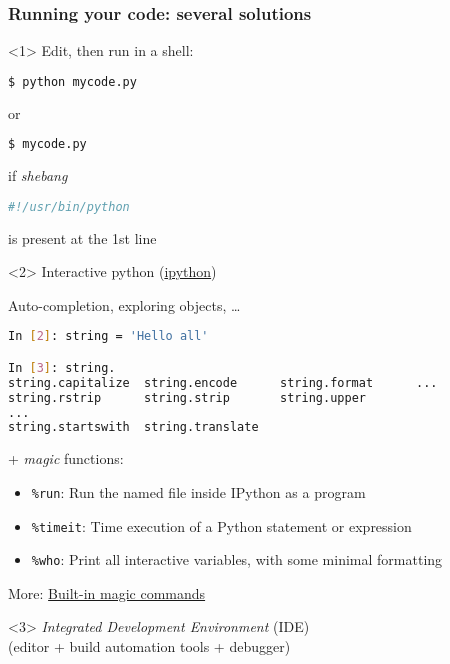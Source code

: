 \begin{frame}[fragile, c]
\frametitle{Running your code: several solutions}

\begin{onlyenv}<1> 
Edit, then run in a shell:
\begin{lstlisting}[language=bash]
$ python mycode.py
\end{lstlisting}
or 
\begin{lstlisting}[language=bash]
$ mycode.py
\end{lstlisting}
if \textit{shebang}
\begin{lstlisting}[language=python]
#!/usr/bin/python
\end{lstlisting}
is present at the 1st line
\end{onlyenv}

\begin{onlyenv}<2> 
Interactive python (\href{http://ipython.org/}{ipython})

Auto-completion, exploring objects, \ldots

\begin{lstlisting}[language=bash]
In [2]: string = 'Hello all'

In [3]: string.
string.capitalize  string.encode      string.format      ...
string.rstrip      string.strip       string.upper       
... 
string.startswith  string.translate   
\end{lstlisting}

+ \textit{magic} functions:

{\footnotesize
\begin{itemize}
\item[] \verb|%run|: Run the named file inside IPython as a program\\
\item[] \verb|%timeit|: Time execution of a Python statement or expression\\
\item[] \verb|%who|: Print all interactive variables, with some minimal formatting
\end{itemize}
}
\vfill

More: \href{http://ipython.readthedocs.org/en/stable/interactive/magics.html?highlight=magic#built-in-magic-commands}{Built-in magic commands}
\end{onlyenv}


\begin{onlyenv}<3> 
\textit{Integrated Development Environment} (IDE)\\
(editor + build automation tools + debugger)


\end{onlyenv}
\end{frame}
